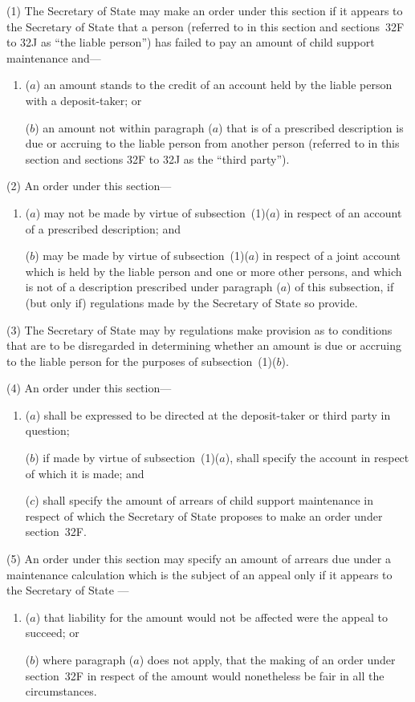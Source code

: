 \documentclass[12pt,a4paper]{article}
\begin{document}
(1) The Secretary of State may make an order under this section if it appears to the 
Secretary of State  %
that a person (referred to in this section and sections~32F to 32J as “the liable person”) has failed to pay an amount of child support maintenance and---
\begin{enumerate}\item[]
($a$) an amount stands to the credit of an account held by the liable person with a deposit-taker; or

($b$) an amount not within paragraph ($a$) that is of a prescribed description is due or accruing to the liable person from another person (referred to in this section and sections 32F to 32J as the “third party”).
\end{enumerate}

(2) An order under this section---
\begin{enumerate}\item[]
($a$) may not be made by virtue of subsection~(1)($a$) in respect of an account of a prescribed description; and

($b$) may be made by virtue of subsection~(1)($a$) in respect of a joint account which is held by the liable person and one or more other persons, and which is not of a description prescribed under paragraph ($a$) of this subsection, if (but only if) regulations made by the Secretary of State so provide.
\end{enumerate}

(3)
The Secretary of State may by regulations make provision as to conditions that are to be disregarded in determining whether an amount is due or accruing to the liable person for the purposes of subsection~(1)($b$).

(4)
An order under this section---
\begin{enumerate}\item[]
($a$) shall be expressed to be directed at the deposit-taker or third party in question;

($b$) if made by virtue of subsection~(1)($a$), shall specify the account in respect of which it is made; and

($c$) shall specify the amount of arrears of child support maintenance in respect of which the 
Secretary of State  %
proposes to make an order under section~32F.
\end{enumerate}

(5) An order under this section may specify an amount of arrears due under a maintenance calculation which is the subject of an appeal only if it appears to the 
Secretary of State%
---
\begin{enumerate}\item[]
($a$) that liability for the amount would not be affected were the appeal to succeed; or

($b$) where paragraph ($a$) does not apply, that the making of an order under section~32F in respect of the amount would nonetheless be fair in all the circumstances.
\end{enumerate}
\end{document}

